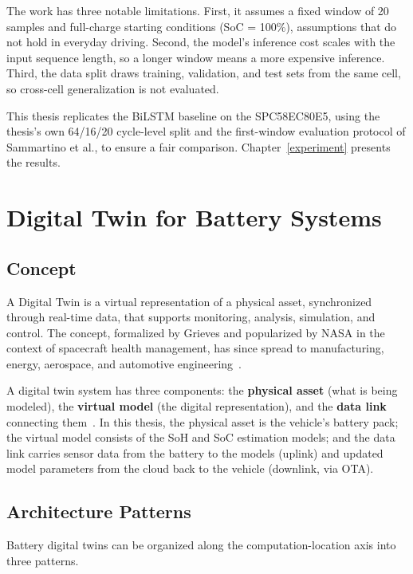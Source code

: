The work has three notable limitations. First, it assumes a fixed window of 20 samples and full-charge starting conditions (SoC = 100\%), assumptions that do not hold in everyday driving. Second, the model's inference cost scales with the input sequence length, so a longer window means a more expensive inference. Third, the data split draws training, validation, and test sets from the same cell, so cross-cell generalization is not evaluated.

This thesis replicates the BiLSTM baseline on the SPC58EC80E5, using the thesis's own 64/16/20 cycle-level split and the first-window evaluation protocol of Sammartino et al., to ensure a fair comparison. Chapter~\ref{experiment} presents the results.


\section{Digital Twin for Battery Systems}
\label{sec:bg_dt}

\subsection{Concept}

A Digital Twin is a virtual representation of a physical asset, synchronized through real-time data, that supports monitoring, analysis, simulation, and control. The concept, formalized by Grieves and popularized by NASA in the context of spacecraft health management, has since spread to manufacturing, energy, aerospace, and automotive engineering~\autocite{grieves2014,tao2019}.

A digital twin system has three components: the \textbf{physical asset} (what is being modeled), the \textbf{virtual model} (the digital representation), and the \textbf{data link} connecting them~\autocite{grieves2014}. In this thesis, the physical asset is the vehicle's battery pack; the virtual model consists of the SoH and SoC estimation models; and the data link carries sensor data from the battery to the models (uplink) and updated model parameters from the cloud back to the vehicle (downlink, via OTA).

\subsection{Architecture Patterns}

Battery digital twins can be organized along the computation-location axis into three patterns.

